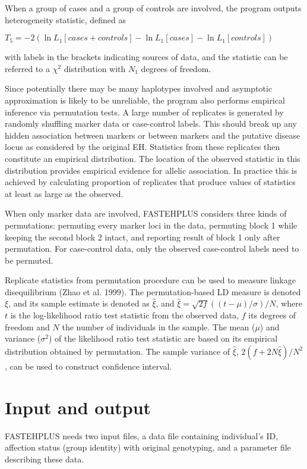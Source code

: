 \documentclass[11pt]{article}
\begin{document}
When a group of cases and a group of controls are involved, the program outputs
heterogeneity statistic, defined as

\medskip
$T_5 = -2(\ln L_1[cases+controls]-\ln L_1[cases]-\ln L_1[controls])$

\medskip
\noindent with labels in the brackets indicating sources of data, and the
statistic can be referred to a $\chi^2$ distribution with $N_1$ degrees of
freedom.

Since potentially there may be many haplotypes involved and asymptotic
approximation is likely to be unreliable, the program also performs empirical
inference via permutation tests.  A large number of replicates is generated by
randomly shuffling marker data or case-control labels.  This should break up
any hidden association between markers or between markers and the putative
disease locus as considered by the original EH.  Statistics from these
replicates then constitute an empirical distribution.  The location of the
observed statistic in this distribution provides empirical evidence for allelic
association.  In practice this is achieved by calculating proportion of
replicates that produce values of statistics at least as large as the observed.

When only marker data are involved, FASTEHPLUS considers three kinds of
permutations:  permuting every marker loci in the data, permuting block 1 while
keeping the second block 2 intact, and reporting result of block 1 only after
permutation.  For case-control data, only the observed case-control labels need
to be permuted.

Replicate statistics from permutation procedure can be used to measure linkage
disequilibrium (Zhao et al.  1999).  The permutation-based LD measure is
denoted $\xi$, and its sample estimate is denoted as $\hat\xi$, and $\hat\xi=
{\sqrt{2f}}({(t-\mu)}/{\sigma})/{N}$, where $t$ is the log-likelihood ratio
test statistic from the observed data, $f$ its degrees of freedom and $N$ the
number of individuals in the sample.  The mean ($\mu$) and variance
($\sigma^2$) of the likelihood ratio test statistic are based on its empirical
distribution obtained by permutation.  The sample variance of $\hat\xi$,
$2(f+2N\hat\xi)/N^2$, can be used to construct confidence interval.

\section{Input and output}

FASTEHPLUS needs two input files, a data file containing individual's ID,
affection status (group identity) with original genotyping, and a parameter
file describing these data.
\end{document}
